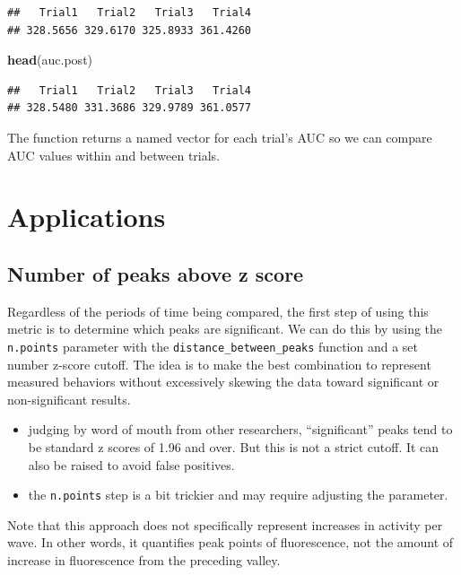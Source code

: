 \documentclass[
]{book}
\newenvironment{Shaded}{\begin{snugshade}}{\end{snugshade}}
\newcommand{\KeywordTok}[1]{\textcolor[rgb]{0.13,0.29,0.53}{\textbf{#1}}}
\newcommand{\NormalTok}[1]{#1}
\providecommand{\tightlist}{%
  \setlength{\itemsep}{0pt}\setlength{\parskip}{0pt}}
\begin{document}
\begin{verbatim}
##   Trial1   Trial2   Trial3   Trial4 
## 328.5656 329.6170 325.8933 361.4260
\end{verbatim}

\begin{Shaded}
\begin{Highlighting}[]
\KeywordTok{head}\NormalTok{(auc.post)}
\end{Highlighting}
\end{Shaded}

\begin{verbatim}
##   Trial1   Trial2   Trial3   Trial4 
## 328.5480 331.3686 329.9789 361.0577
\end{verbatim}

The function returns a named vector for each trial's AUC so we can compare AUC values within and between trials.

\hypertarget{analysis-app}{%
\section{Applications}\label{analysis-app}}

\hypertarget{analysis-app-numpeaks}{%
\subsection{Number of peaks above z score}\label{analysis-app-numpeaks}}

Regardless of the periods of time being compared, the first step of using this metric is to determine which peaks are significant. We can do this by using the \texttt{n.points} parameter with the \texttt{distance\_between\_peaks} function and a set number z-score cutoff. The idea is to make the best combination to represent measured behaviors without excessively skewing the data toward significant or non-significant results.

\begin{itemize}
\tightlist
\item
  judging by word of mouth from other researchers, ``significant'' peaks tend to be standard z scores of 1.96 and over. But this is not a strict cutoff. It can also be raised to avoid false positives.
\item
  the \texttt{n.points} step is a bit trickier and may require adjusting the parameter.
\end{itemize}

Note that this approach does not specifically represent increases in activity per wave. In other words, it quantifies peak points of fluorescence, not the amount of increase in fluorescence from the preceding valley.
\end{document}
